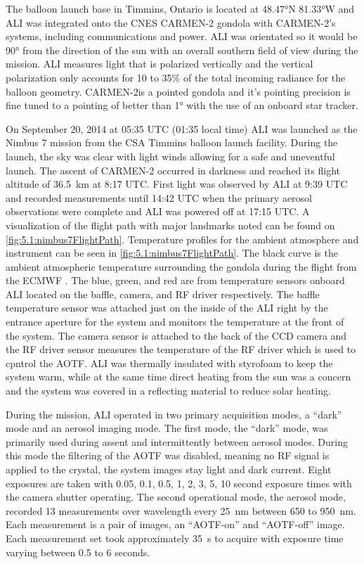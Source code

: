 \documentclass[12pt]{article}
\begin{document}
The balloon launch base in Timmins, Ontario is located at 48.47\si{\degree}N 81.33\si{\degree}W and ALI was integrated onto the CNES CARMEN-2 gondola with CARMEN-2's systems, including communications and power. ALI was orientated so it would be 90\si{\degree} from the direction of the sun with an overall southern field of view during the mission. ALI measures light that is polarized vertically and the vertical polarization only accounts for 10 to 35\% of the total incoming radiance for the balloon geometry. CARMEN-2is a pointed gondola and it's pointing precision is fine tuned to a pointing of better than 1\si{\degree} with the use of an onboard star tracker.

On September 20, 2014 at 05:35 UTC (01:35 local time) ALI was launched as the Nimbus 7 mission from the CSA Timmins balloon launch facility. During the launch, the sky was clear with light winds allowing for a safe and uneventful launch. The ascent of CARMEN-2 occurred in darkness and reached its flight altitude of 36.5~km at 8:17 UTC. First light was observed by ALI at 9:39 UTC and recorded measurements until 14:42 UTC when the primary aerosol observations were complete and ALI was powered off at 17:15 UTC. A visualization of the flight path with major landmarks noted can be found on \autoref{fig:5.1:nimbus7FlightPath}. Temperature profiles for the ambient atmosphere and instrument can be seen in \autoref{fig:5.1:nimbus7FlightPath}. The black curve is the ambient atmospheric temperature surrounding the gondola during the flight from the ECMWF \citep{Molteni1996}. The blue, green, and red are from temperature sensors onboard ALI located on the baffle, camera, and RF driver respectively. The baffle temperature sensor was attached just on the inside of the ALI right by the entrance aperture for the system and monitors the temperature at the front of the system. The camera sensor is attached to the back of the CCD camera and the RF driver sensor measures the temperature of the RF driver which is used to cpntrol the AOTF. ALI was thermally insulated with styrofoam to keep the system warm, while at the same time direct heating from the sun was a concern and the system was covered in a reflecting material to reduce solar heating.

During the mission, ALI operated in two primary acquisition modes, a ``dark'' mode and an aerosol imaging mode. The first mode, the ``dark'' mode, was primarily used during assent and intermittently between aerosol modes. During this mode the filtering of the AOTF was disabled, meaning no RF signal is applied to the crystal, the system images stay light and dark current. Eight exposures are taken with 0.05, 0.1, 0.5, 1, 2, 3, 5, 10 second exposure times with the camera shutter operating. The second operational mode, the aerosol mode, recorded 13 measurements over wavelength every 25~nm between 650 to 950~nm. Each measurement is a pair of images, an ``AOTF-on'' and ``AOTF-off'' image. Each measurement set took approximately 35~s to acquire with exposure time varying between 0.5 to 6 seconds.
\end{document}
